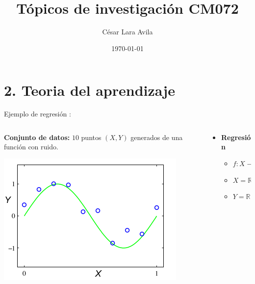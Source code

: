 \documentclass[11pt]{beamer}
\title{T\'opicos de investigaci\'on  CM072}
\date{\today}
\author{C\'esar Lara Avila}
\institute{\url{https://github.com/C-Lara}}
\begin{document}
  \maketitle
  \section{2. Teoria del aprendizaje }
  
\begin{frame}{Ejemplo de regresi\'on :}
\begin{columns}
\begin{column}{0.5\textwidth}
\textbf{Conjunto de datos:}  $10$ puntos $(X,Y)$ generados de una funci\'on  con ruido.

\vspace{0.2cm}
		
\includegraphics[scale= 0.45]{TA1.png}
	\end{column}
	\begin{column}{0.5\textwidth}  
		\begin{itemize}
			\item \textbf{Regresi\'on}
			\begin{itemize}
				\item $f: X \rightarrow Y$
				\item $X = \mathbb{R}$
				\item $Y = \mathbb{R}$
			\end{itemize}
			\vspace{3.6cm}
			
		\end{itemize}
	\end{column}
\end{columns}
	
\end{frame}
\end{document}

